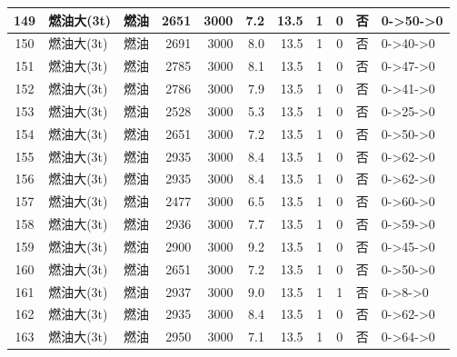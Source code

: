 \begin{landscape}
\begin{longtable}{|c|l|c|r|r|r|r|c|c|c|p{2.8cm}|}
\hline
\rowcolor{gray!8}
149 & 燃油大(3t) & 燃油 & 2651 & 3000 & 7.2 & 13.5 & 1 & 0 & 否 & 0->50->0 \\
\hline
150 & 燃油大(3t) & 燃油 & 2691 & 3000 & 8.0 & 13.5 & 1 & 0 & 否 & 0->40->0 \\
\hline
\rowcolor{gray!8}
151 & 燃油大(3t) & 燃油 & 2785 & 3000 & 8.1 & 13.5 & 1 & 0 & 否 & 0->47->0 \\
\hline
152 & 燃油大(3t) & 燃油 & 2786 & 3000 & 7.9 & 13.5 & 1 & 0 & 否 & 0->41->0 \\
\hline
\rowcolor{gray!8}
153 & 燃油大(3t) & 燃油 & 2528 & 3000 & 5.3 & 13.5 & 1 & 0 & 否 & 0->25->0 \\
\hline
154 & 燃油大(3t) & 燃油 & 2651 & 3000 & 7.2 & 13.5 & 1 & 0 & 否 & 0->50->0 \\
\hline
\rowcolor{gray!8}
155 & 燃油大(3t) & 燃油 & 2935 & 3000 & 8.4 & 13.5 & 1 & 0 & 否 & 0->62->0 \\
\hline
156 & 燃油大(3t) & 燃油 & 2935 & 3000 & 8.4 & 13.5 & 1 & 0 & 否 & 0->62->0 \\
\hline
\rowcolor{gray!8}
157 & 燃油大(3t) & 燃油 & 2477 & 3000 & 6.5 & 13.5 & 1 & 0 & 否 & 0->60->0 \\
\hline
158 & 燃油大(3t) & 燃油 & 2936 & 3000 & 7.7 & 13.5 & 1 & 0 & 否 & 0->59->0 \\
\hline
\rowcolor{gray!8}
159 & 燃油大(3t) & 燃油 & 2900 & 3000 & 9.2 & 13.5 & 1 & 0 & 否 & 0->45->0 \\
\hline
160 & 燃油大(3t) & 燃油 & 2651 & 3000 & 7.2 & 13.5 & 1 & 0 & 否 & 0->50->0 \\
\hline
\rowcolor{gray!8}
161 & 燃油大(3t) & 燃油 & 2937 & 3000 & 9.0 & 13.5 & 1 & 1 & 否 & 0->8->0 \\
\hline
162 & 燃油大(3t) & 燃油 & 2935 & 3000 & 8.4 & 13.5 & 1 & 0 & 否 & 0->62->0 \\
\hline
\rowcolor{gray!8}
163 & 燃油大(3t) & 燃油 & 2950 & 3000 & 7.1 & 13.5 & 1 & 0 & 否 & 0->64->0 \\
\hline
\end{longtable}
\end{landscape}


